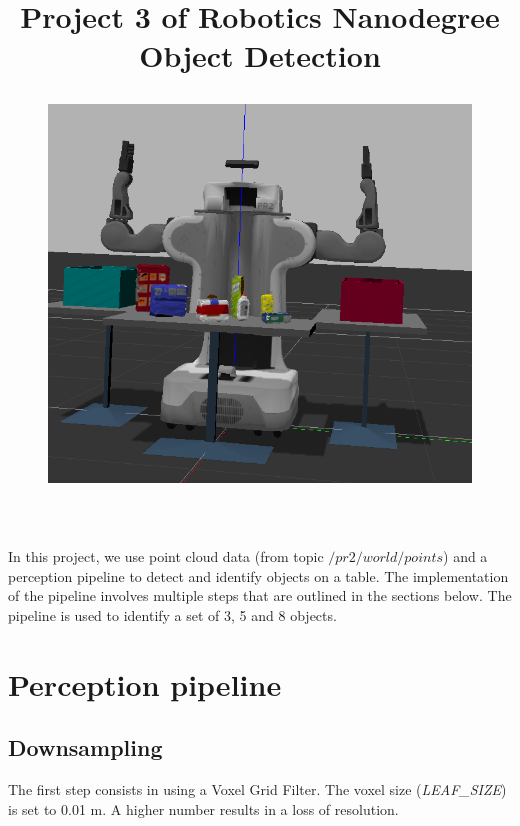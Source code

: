 \documentclass[a4paper,12pt]{report}
\begin{document}
\title{Project 3 of Robotics Nanodegree
  \\
Object Detection
\begin{figure}[H]
\centering
        \includegraphics[totalheight=9cm]{imgs/title1.png}
\end{figure}}
\maketitle
In this project, we use point cloud data (from topic $/pr2/world/points$) and a perception pipeline to detect and identify objects on a table. The implementation of the pipeline involves multiple steps that are outlined in the sections below. The pipeline is used to identify a set of 3, 5 and 8 objects.

\section{Perception pipeline}

\subsection{Downsampling}
The first step consists in using a Voxel Grid Filter. The voxel size (\textit{LEAF\_SIZE}) is set to 0.01 m. A higher number results in a loss of resolution.

\linespread{1.3}

\end{document}
